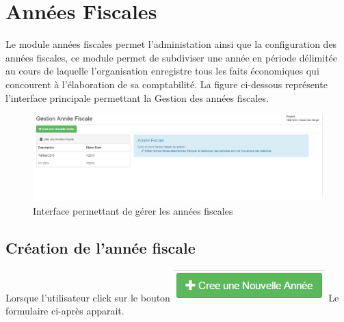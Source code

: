 \documentclass[12pt,a4paper]{report}
\begin{document}
\newpage
\section{Années Fiscales}

Le module années fiscales permet l'administation ainsi que la configuration des années fiscales, ce module permet de subdiviser une année en période délimitée au cours de laquelle l'organisation enregistre tous les faits économiques qui concourent à l'élaboration de sa comptabilité.
La figure ci-dessous représente l'interface principale permettant la Gestion des années fiscales. 

\begin{figure}[h]
\begin{center}
\includegraphics[width=14cm]{pic/AnneeFiscal.png}
\end{center}
\caption{Interface permettant de gérer les années fiscales}
\label{Interface permettant de gérer les années fiscales}
\end{figure}

\newpage
\subsection{Création de l'année fiscale}
Lorsque l'utilisateur click sur le bouton \includegraphics[scale=0.7]{pic/CreeAnnFisc.png} Le formulaire ci-après apparait.
\end{document}
